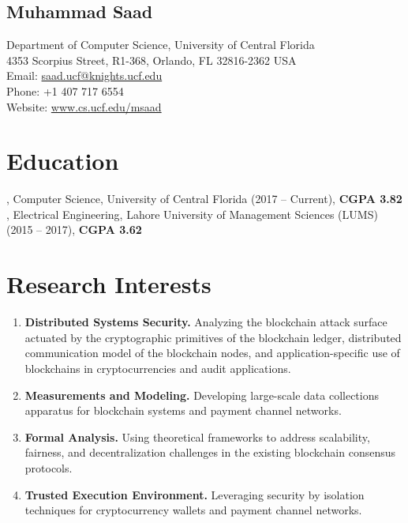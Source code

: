 \documentclass[10pt]{article}
\newcommand{\BfPara}[1]{{\noindent\bf{#1}.}}
\begin{document}
\begin{flushleft}
\section*{Muhammad Saad}\vspace{-2mm}
Department of Computer Science, University of Central Florida\\
4353 Scorpius Street, R1-368, Orlando, FL 32816-2362 USA\\
Email: \href{saad.ucf@knights.ucf.edu}{saad.ucf@knights.ucf.edu}\\
Phone: {+1 407 717 6554}\\
Website: \href{http://www.cs.ucf.edu/~msaad/}{www.cs.ucf.edu/msaad}
\end{flushleft}
\section*{\sc Education} 

, Computer Science, University of Central Florida (2017 -- Current), \textbf{CGPA 3.82} \\
\vspace{-1mm}
, Electrical Engineering, Lahore University of Management Sciences (LUMS) (2015 -- 2017), \textbf{CGPA 3.62}\\


\section*{\sc Research Interests}
\begin{enumerate}
    \item \BfPara{Distributed Systems Security} Analyzing the blockchain attack surface actuated by the cryptographic primitives of the blockchain ledger, distributed communication model of the blockchain nodes, and application-specific use of blockchains in cryptocurrencies and audit applications. 
    \item \BfPara{Measurements and Modeling} Developing large-scale data collections apparatus for blockchain systems and payment channel networks.
    \item \BfPara{Formal Analysis} Using theoretical frameworks to address scalability, fairness, and decentralization challenges in the existing blockchain consensus protocols. 
    \item \BfPara{Trusted Execution Environment} Leveraging security by isolation techniques for cryptocurrency wallets and payment channel networks.   
\end{enumerate}
  
\end{document}
